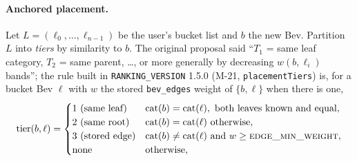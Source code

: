 \documentclass[11pt]{article}
\DeclareMathOperator{\cat}{cat}
\newcommand{\code}[1]{\texttt{#1}}
\theoremstyle{plain}
\theoremstyle{definition}
\theoremstyle{remark}
\begin{document}
\paragraph{Anchored placement.} Let $L = (\ell_0, \dots, \ell_{n-1})$ be the user's bucket list and $b$ the new Bev. Partition $L$ into \emph{tiers} by similarity to $b$. The original proposal said ``$T_1$ = same leaf category, $T_2$ = same parent, \dots, or more generally by decreasing $w(b, \ell_i)$ bands''; the rule built in \code{RANKING\_VERSION} 1.5.0 (M-21, \code{placementTiers}) is, for a bucket Bev $\ell$ with $w$ the stored \code{bev\_edges} weight of $\{b, \ell\}$ when there is one,
\begin{equation}\label{eq:tiers}
\mathrm{tier}(b, \ell) = \begin{cases}
1\ \text{(same leaf)} & \cat(b) = \cat(\ell),\ \text{both leaves known and equal},\\
2\ \text{(same root)} & \cat(b) = \cat(\ell)\ \text{otherwise},\\
3\ \text{(stored edge)} & \cat(b) \ne \cat(\ell)\ \text{and}\ w \ge \textsc{edge\_min\_weight},\\
\text{none} & \text{otherwise},
\end{cases}
\end{equation}
\end{document}
